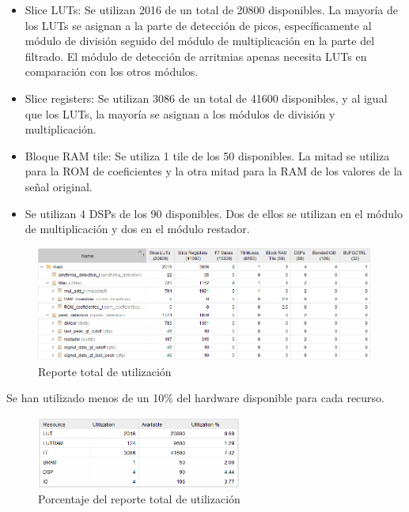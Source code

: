 \begin{itemize}
    \item Slice LUTs: Se utilizan 2016 de un total de 20800 disponibles. La mayoría de los LUTs se asignan a la parte de detección de picos, específicamente al módulo de división seguido del módulo de multiplicación en la parte del filtrado. El módulo de detección de arritmias apenas necesita LUTs en comparación con los otros módulos.
    \item Slice registers: Se utilizan 3086 de un total de 41600 disponibles, y al igual que los LUTs, la mayoría se asignan a los módulos de división y multiplicación.
    \item Bloque RAM tile: Se utiliza 1 tile de los 50 disponibles. La mitad se utiliza para la ROM de coeficientes y la otra mitad para la RAM de los valores de la señal original.
    \item Se utilizan 4 DSPs de los 90 disponibles. Dos de ellos se utilizan en el módulo de multiplicación y dos en el módulo restador.
\end{itemize}


\begin{figure}[h]
	\centering
	\includegraphics[width=0.99\textwidth]{./Images/img_res_experimentales/utilization1.png}
	\caption{Reporte total de utilización}
	\label{fig:utilization1}
\end{figure}

Se han utilizado menos de un 10\% del hardware disponible para cada recurso.
\begin{figure}[h]
	\centering
	\includegraphics[width=0.6\textwidth]{./Images/img_res_experimentales/utilization2.png}
	\caption{Porcentaje del reporte total de utilización}
	\label{fig:utilization2}
\end{figure}

